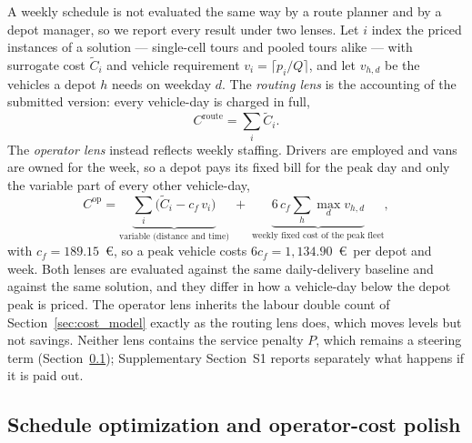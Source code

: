 \documentclass[preprint,12pt,authoryear]{elsarticle}
\begin{document}
A weekly schedule is not evaluated the same way by a route planner and by a depot manager, so we report every result under two lenses. Let $i$ index the priced instances of a solution --- single-cell tours and pooled tours alike --- with surrogate cost $\tilde{C}_i$ and vehicle requirement $v_i = \lceil p_i / Q \rceil$, and let $v_{h,d}$ be the vehicles a depot $h$ needs on weekday $d$. The \emph{routing lens} is the accounting of the submitted version: every vehicle-day is charged in full,
\begin{equation}
\label{eq:lens_routing}
C^{\mathrm{route}} = \sum_i \tilde{C}_i .
\end{equation}
The \emph{operator lens} instead reflects weekly staffing. Drivers are employed and vans are owned for the week, so a depot pays its fixed bill for the peak day and only the variable part of every other vehicle-day,
\begin{equation}
\label{eq:lens_operator}
C^{\mathrm{op}} = \underbrace{\sum_i \bigl( \tilde{C}_i - c_f\, v_i \bigr)}_{\text{variable (distance and time)}} \; + \; \underbrace{6\, c_f \sum_h \max_d v_{h,d}}_{\text{weekly fixed cost of the peak fleet}},
\end{equation}
with $c_f = 189.15$~\euro, so a peak vehicle costs $6 c_f = 1{,}134.90$~\euro\ per depot and week. Both lenses are evaluated against the same daily-delivery baseline and against the same solution, and they differ in how a vehicle-day below the depot peak is priced. The operator lens inherits the labour double count of Section~\ref{sec:cost_model} exactly as the routing lens does, which moves levels but not savings. Neither lens contains the service penalty $P$, which remains a steering term (Section~\ref{sec:schedule_opt}); Supplementary Section~S1 reports separately what happens if it is paid out.

\subsection{Schedule optimization and operator-cost polish}
\label{sec:schedule_opt}
\end{document}
